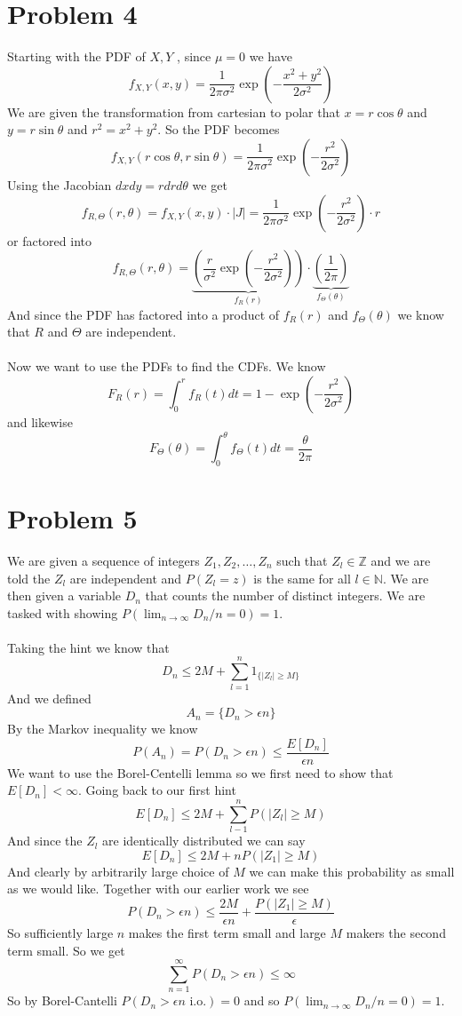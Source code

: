 \documentclass[a4paper]{article}
\begin{document}
\section*{Problem 4}
Starting with the PDF of $X,Y$ , since $\mu = 0$ we have
\[ f_{X,Y}(x,y) = \frac{1}{2\pi \sigma^2}\exp \left( -\frac{x^2+y^2}{2\sigma^2} \right) \]
 We are given the transformation from cartesian to polar that $x = r\cos\theta$ and $y=r\sin\theta$ and $r^2 = x^2 + y^2$. So the PDF becomes
 \[ f_{X,Y}(r\cos\theta,r\sin\theta) = \frac{1}{2\pi \sigma^2}\exp \left( -\frac{r^2}{2\sigma^2} \right)\]
 Using the Jacobian $dxdy=rdrd\theta$ we get
 \[ f_{R,\Theta}(r,\theta) = f_{X,Y}(x,y)\cdot |J|=\frac{1}{2\pi \sigma^2}\exp \left( -\frac{r^2}{2\sigma^2} \right) \cdot r \]
 or factored into
 \[ f_{R,\Theta}(r, \theta) = \underbrace{\left(\frac{r}{\sigma^2} \exp\left(-\frac{r^2}{2\sigma^2}\right)\right)}_{f_R(r)} \cdot \underbrace{\left(\frac{1}{2\pi}\right)}_{f_\Theta(\theta)} \]
And since the PDF has factored into a product of $f_R(r)$ and $f_\Theta(\theta)$ we know that $R$ and $\Theta$ are independent. 
\\ \\
Now we want to use the PDFs to find the CDFs. We know 
\[ F_R(r) = \int_0^r f_R(t)dt = 1-\exp\left( -\frac{r^2}{2\sigma^2}\right)\]
and likewise
\[ F_\Theta(\theta) = \int_0^{\theta}f_\Theta(t)dt = \frac{\theta}{2\pi}\]

\section*{Problem 5}
We are given a sequence of integers $Z_1, Z_2, \dots, Z_n$ such that $Z_l \in \mathbb{Z}$ and we are told the $Z_l$ are independent and $P(Z_l = z)$ is the same for all $l \in \mathbb{N}$. We are then given a variable $D_n$ that counts the number of distinct integers. We are tasked with showing $P(\lim_{n \to \infty} D_n/n = 0)=1$. 
\\ \\
Taking the hint we know that 
\[ D_n \leq 2M + \sum_{l=1}^n 1_{\{|Z_l| \geq M\} } \]
And we defined
\[ A_n = \{ D_n > \epsilon n \} \]
By the Markov inequality we know
\[ P(A_n) = P( D_n > \epsilon n ) \leq \frac{E[D_n]}{\epsilon n}\]
We want to use the Borel-Centelli lemma so we first need to show that $E[D_n] < \infty$. Going back to our first hint
\[ E[D_n] \leq 2M + \sum_{l-1}^n P(|Z_l| \geq M) \]
And since the $Z_l$ are identically distributed we can say 
\[ E[D_n] \leq 2M + n P(|Z_1| \geq M) \]
And clearly by arbitrarily large choice of $M$ we can make this probability as small as we would like. Together with our earlier work we see
\[ P(D_n > \epsilon n) \leq \frac{2M}{\epsilon n}+\frac{P(|Z_1| \geq M)}{\epsilon}\]
So sufficiently large $n$ makes the first term small and large $M$ makers the second term small. So we get
\[ \sum_{n=1}^\infty P(D_n > \epsilon n) \leq \infty \]
So by Borel-Cantelli $P(D_n > \epsilon n \text{ i.o.})=0$ and so $P(\lim_{n \to \infty} D_n/n = 0)=1$.
\end{document}
